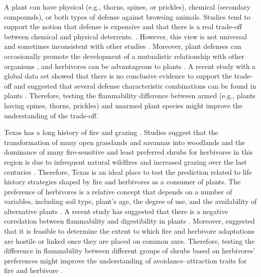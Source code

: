 \documentclass{ttuthes2007}
\begin{document}
A plant can have physical (e.g., thorns, spines, or prickles), chemical (secondary compounds), or both types of defense against browsing animals. Studies tend to support the notion that defense is expensive and that there is a real trade-off between chemical and physical deterrents. \citep{rhoades1979evolution, van1988defence,twigg1996physicalchemical}. However, this view is not universal and sometimes inconsistent with other studies \citep{iddles2003potentialnegativecorrelation,steward1988theredifferentview,koricheva2004metanegativecorrelation}. Moreover, plant defenses can occasionally promote the development of a mutualistic relationship with other organisms \citep{janzen1966coevolution}, and herbivores can  be advantageous to plants \citep{belsky1986does}. A recent study with a global data set showed that there is no conclusive evidence to support the trade-off and suggested that several defense characteristic combinations can be found in plants \citep{moles2013correlations}. Therefore, testing the flammability difference between armed (e.g., plants having spines, thorns, prickles) and unarmed plant species might improve the understanding of the trade-off.

Texas has a long history of fire \citep{moir1982firehistory, stambaugh2011firehistory,stambaugh2014historicalfirehistory,smeins2005historyoffire1} and grazing \citep{buechner1950lifegrazing, wilcox2012historicalgrazing2}. Studies suggest that the transformation of many open grasslands and savannas into woodlands and the dominance of many fire-sensitive and least preferred shrubs for herbivores in this region is due to infrequent natural wildfires and increased grazing over the last centuries \citep{archer1989havejoint,andruk2014joint, masters1986prescribed}. Therefore, Texas is an ideal place to test the prediction related to life history strategies shaped by fire and herbivores as a consumer of plants. The preference of herbivores is a relative concept that depends on a number of variables, including soil type, plant's age, the degree of use, and the availability of alternative plants \citep{wright2003white}.  A recent study has suggested that there is a negative correlation between flammability and digestibility in plants \citep{gowda2022digestibility}. Moreover, \citep{archibald2019unified} suggested that it is feasible to determine the extent to which fire and herbivore adaptations are hostile or linked once they are placed on common axes. Therefore, testing the difference in flammability between different groups of shrubs based on herbivores' preferences might improve the understanding of avoidance–attraction traits for fire and herbivore \citep{schwilk2003flammability, archibald2019unified}. 
\end{document}
